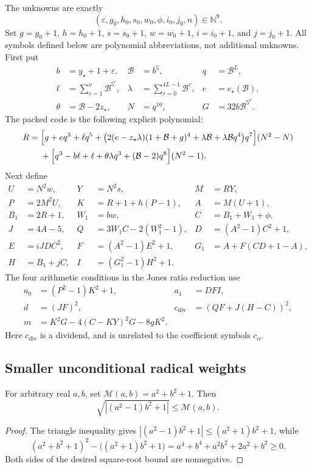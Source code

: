 The unknowns are exactly
\[
 (\varepsilon,g_0,h_0,s_0,w_0,\phi,i_0,j_0,n)\in\mathbb N^9.
\]
Set $g=g_0+1$, $h=h_0+1$, $s=s_0+1$, $w=w_0+1$,
$i=i_0+1$, and $j=j_0+1$.  All symbols defined below are polynomial
abbreviations, not additional unknowns.  First put
\begin{align*}
 b&=y_\star+1+\varepsilon,&
 \mathcal B&=b^5,& q&=\mathcal B^L,\\
 \ell&=\sum_{r=1}^{\nu}\mathcal B^{5^r},&
 \lambda&=\sum_{r=0}^{4L-1}\mathcal B^r,&
 e&=e_\star(\mathcal B),\\
 \theta&=\mathcal B-2z_\star,&
 N&=q^{16},&G&=32b\mathcal B^{5^\nu}.
\end{align*}
The packed code is the following explicit polynomial:
\begin{align}
 R={}&\Bigl[g+eq^3+\ell q^5+
  \bigl(2(e-z_\star\lambda)(1+\mathcal B+g)^4
       +\lambda\mathcal B+\lambda\mathcal Bq^4\bigr)q^7\Bigr](N^2-N)
 \notag\\
 &+\Bigl[q^3-b\ell+\ell+\theta\lambda q^3+
                 (\mathcal B-2)q^8\Bigr](N^2-1).
 \label{eq:nine-R}
\end{align}
Next define
\begin{align*}
 U&=N^2w,&Y&=N^2s,&M&=RY,\\
 P&=2M^2U,&K&=R+1+h(P-1),&A&=M(U+1),\\
 B_1&=2R+1,&W_1&=bw,&C&=B_1+W_1+\phi,\\
 J&=4A-5,&Q&=3W_1C-2(W_1^2-1),&D&=(A^2-1)C^2+1,\\
 E&=iJDC^2,&F&=(A^2-1)E^2+1,&G_1&=A+F(CD+1-A),\\
 H&=B_1+jC,&I&=(G_1^2-1)H^2+1.&
\end{align*}
The four arithmetic conditions in the Jones ratio reduction use
\begin{align*}
 a_0&=(P^2-1)K^2+1,&a_1&=DFI,\\
 d&=(JF)^2,&c_\mathrm{div}&=(QF+J(H-C))^2,\\
 m&=K^2G-4(C-KY)^2G-8gK^2.
\end{align*}
Here $c_\mathrm{div}$ is a dividend, and is unrelated to the
coefficient symbols $c_\alpha$.

\subsection{Smaller unconditional radical weights}

\begin{lemma}
\label{lem:nine-majorant}
For arbitrary real $a,b$, set $\mathcal M(a,b)=a^2+b^2+1$.
Then
\[
 \sqrt{\left|(a^2-1)b^2+1\right|}\leq\mathcal M(a,b).
\]
\end{lemma}
\begin{proof}
The triangle inequality gives
$|(a^2-1)b^2+1|\leq(a^2+1)b^2+1$, while
\[
 (a^2+b^2+1)^2-\bigl((a^2+1)b^2+1\bigr)
   =a^4+b^4+a^2b^2+2a^2+b^2\geq0.
\]
Both sides of the desired square-root bound are nonnegative.
\end{proof}

